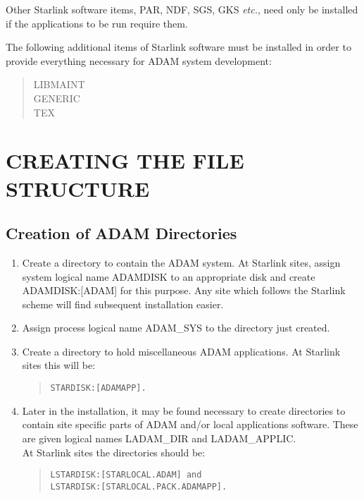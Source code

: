 Other Starlink software items, PAR, NDF, SGS, GKS {\em etc.}, need only be
installed if the applications to be run require them.

The following additional items of Starlink software must be installed in order
to provide everything necessary for ADAM system development:
\small \begin{quote}
LIBMAINT \\
GENERIC \\
TEX
\end{quote} \normalsize

\section{CREATING THE FILE STRUCTURE}
\subsection{Creation of ADAM Directories}
\label{dirs}
\begin{enumerate}
\item Create a directory to contain the ADAM system.
At Starlink sites, assign system logical name ADAMDISK to an appropriate disk
and create ADAMDISK:[ADAM] for this purpose.
Any site which follows the Starlink scheme will find subsequent installation
easier.
\item Assign process logical name ADAM\_SYS to the directory just created.
\item Create a directory to hold miscellaneous ADAM applications.
At Starlink sites this will be:
\small \begin{quote}
\begin{verbatim}
STARDISK:[ADAMAPP].
\end{verbatim}
\end{quote} \normalsize
\item Later in the installation, it may be found necessary to create directories
to contain site specific parts of ADAM and/or local applications software.
These are given logical names LADAM\_DIR and LADAM\_APPLIC.\\
At Starlink sites the directories should be:
\small \begin{quote}
\begin{verbatim}
LSTARDISK:[STARLOCAL.ADAM] and
LSTARDISK:[STARLOCAL.PACK.ADAMAPP].
\end{verbatim}
\end{quote} \normalsize
\end{enumerate}

